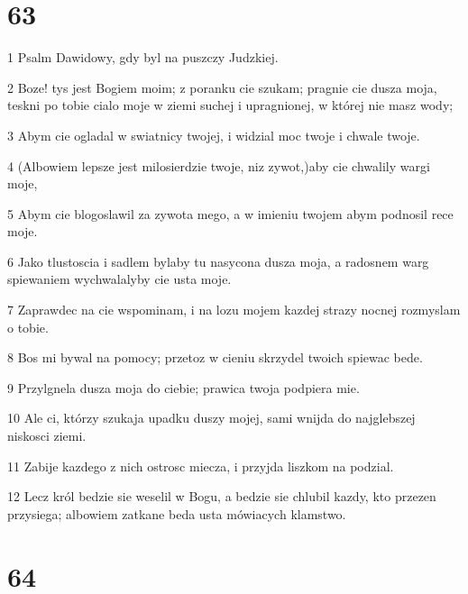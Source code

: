 \chapter{63}

\par 1 Psalm Dawidowy, gdy byl na puszczy Judzkiej.
\par 2 Boze! tys jest Bogiem moim; z poranku cie szukam; pragnie cie dusza moja, teskni po tobie cialo moje w ziemi suchej i upragnionej, w której nie masz wody;
\par 3 Abym cie ogladal w swiatnicy twojej, i widzial moc twoje i chwale twoje.
\par 4 (Albowiem lepsze jest milosierdzie twoje, niz zywot,)aby cie chwalily wargi moje,
\par 5 Abym cie blogoslawil za zywota mego, a w imieniu twojem abym podnosil rece moje.
\par 6 Jako tlustoscia i sadlem bylaby tu nasycona dusza moja, a radosnem warg spiewaniem wychwalalyby cie usta moje.
\par 7 Zaprawdec na cie wspominam, i na lozu mojem kazdej strazy nocnej rozmyslam o tobie.
\par 8 Bos mi bywal na pomocy; przetoz w cieniu skrzydel twoich spiewac bede.
\par 9 Przylgnela dusza moja do ciebie; prawica twoja podpiera mie.
\par 10 Ale ci, którzy szukaja upadku duszy mojej, sami wnijda do najglebszej niskosci ziemi.
\par 11 Zabije kazdego z nich ostrosc miecza, i przyjda liszkom na podzial.
\par 12 Lecz król bedzie sie weselil w Bogu, a bedzie sie chlubil kazdy, kto przezen przysiega; albowiem zatkane beda usta mówiacych klamstwo.

\chapter{64}

